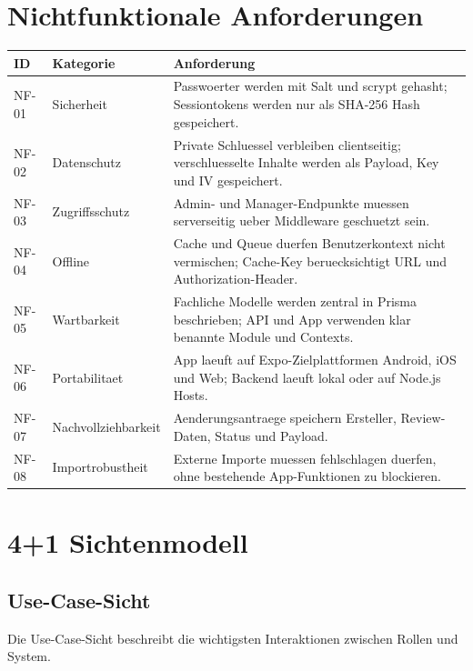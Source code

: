 \documentclass[11pt,a4paper]{article}
\begin{document}
\section{Nichtfunktionale Anforderungen}
\begin{longtable}{@{}p{20mm}p{35mm}p{86mm}@{}}
\toprule
ID & Kategorie & Anforderung\\
\midrule
\endhead
NF-01 & Sicherheit & Passwoerter werden mit Salt und scrypt gehasht; Sessiontokens werden nur als SHA-256 Hash gespeichert.\\
NF-02 & Datenschutz & Private Schluessel verbleiben clientseitig; verschluesselte Inhalte werden als Payload, Key und IV gespeichert.\\
NF-03 & Zugriffsschutz & Admin- und Manager-Endpunkte muessen serverseitig ueber Middleware geschuetzt sein.\\
NF-04 & Offline & Cache und Queue duerfen Benutzerkontext nicht vermischen; Cache-Key beruecksichtigt URL und Authorization-Header.\\
NF-05 & Wartbarkeit & Fachliche Modelle werden zentral in Prisma beschrieben; API und App verwenden klar benannte Module und Contexts.\\
NF-06 & Portabilitaet & App laeuft auf Expo-Zielplattformen Android, iOS und Web; Backend laeuft lokal oder auf Node.js Hosts.\\
NF-07 & Nachvollziehbarkeit & Aenderungsantraege speichern Ersteller, Review-Daten, Status und Payload.\\
NF-08 & Importrobustheit & Externe Importe muessen fehlschlagen duerfen, ohne bestehende App-Funktionen zu blockieren.\\
\bottomrule
\end{longtable}

\section{4+1 Sichtenmodell}
\subsection{Use-Case-Sicht}
Die Use-Case-Sicht beschreibt die wichtigsten Interaktionen zwischen Rollen und System.
\end{document}
